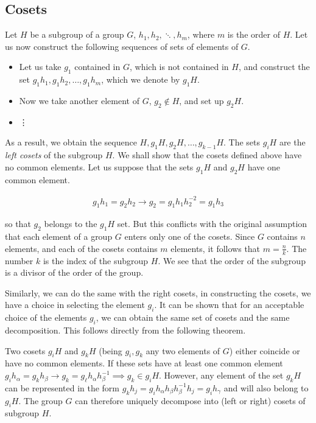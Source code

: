 \subsection{Cosets} %
\label{sub:Cosets}

Let $H$ be a subgroup of a group $G$, $h_1,h_2,\ddots, h_m$, where $m$ is the
order of $H$. Let us now construct the following sequences of sets of elements
of $G$.
\begin{itemize}
    \item Let us take $g_1$ contained in $G$, which is not contained in $H$, and
        construct the set $g_1h_1,g_1h_2,\dots,g_1h_m$, which we denote by $g_1H$.
    \item Now we take another element of $G$, $g_2\notin H$, and set up $g_2H$.
    \item \vdots
\end{itemize}

As a result, we obtain the sequence $H,g_1H,g_2H,\dots,g_{k-1}H$. The sets $g_iH$
are the \emph{left cosets} of the subgroup $H$. We shall show that the cosets
defined above have no common elements. Let us suppose that the sets $g_1H$ and
$g_2H$ have one common element.

\begin{align}
    g_1h_1=g_2h_2\rightarrow g_2=g_1h_1h_2^{-2}=g_1h_3
\end{align}

so that $g_2$ belongs to the $g_1H$ set. But this conflicts with the original
assumption that each element of a group $G$ enters only one of the cosets. Since
$G$ contains $n$ elements, and each of the cosets contains $m$ elements, it
follows that $m=\frac nk$. The number $k$ is the index of the subgroup $H$. We
see that the order of the subgroup is a divisor of the order of the group.

Similarly, we can do the same with the right cosets, in constructing the cosets,
we have a choice in selecting the element $g_i$. It can be shown that for an
acceptable choice of the elements $g_i$, we can obtain the same set of cosets
and the same decomposition. This follows directly from the following theorem.

\begin{theorem}
    Two cosets $g_iH$ and $g_kH$ (being $g_i, g_k$ any two elements of $G$)
    either coincide or have no common elements. If these sets have at least
    one common element $g_ih_\alpha=g_kh_\beta\rightarrow g_k=g_\ell h_\alpha
    h_\beta^{-1}\implies g_k\in g_iH$.
    However, any element of the set $g_kH$ can be represented in the form
    $g_kh_j=g_ih_\alpha h_\beta h_\beta^{-1} h_j=g_ih_\gamma$ and will also belong
    to $g_iH$.
    The group $G$ can therefore uniquely decompose into (left or right) cosets
    of subgroup $H$.
\end{theorem}

